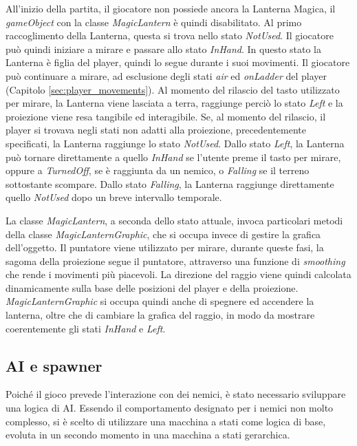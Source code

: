 All’inizio della partita, il giocatore non possiede ancora la Lanterna Magica, il \textit{gameObject} con la classe \textit{MagicLantern} è quindi disabilitato. Al primo raccoglimento della Lanterna, questa si trova nello stato \textit{NotUsed}. Il giocatore può quindi iniziare a mirare e passare allo stato \textit{InHand}. In questo stato la Lanterna è figlia del player, quindi lo segue durante i suoi movimenti.
Il giocatore può continuare a mirare, ad esclusione degli stati \textit{air} ed \textit{onLadder} del player (Capitolo \ref{sec:player_movements}).
Al momento del rilascio del tasto utilizzato per mirare, la Lanterna viene lasciata a terra, raggiunge perciò lo stato \textit{Left} e la proiezione viene resa tangibile ed interagibile. Se, al momento del rilascio, il player si trovava negli stati non adatti alla proiezione, precedentemente specificati, la Lanterna raggiunge lo stato \textit{NotUsed}.
Dallo stato \textit{Left}, la Lanterna può tornare direttamente a quello \textit{InHand} se l’utente preme il tasto per mirare, oppure a \textit{TurnedOff}, se è raggiunta da un nemico, o \textit{Falling} se il terreno sottostante scompare.
Dallo stato \textit{Falling}, la Lanterna raggiunge direttamente quello \textit{NotUsed} dopo un breve intervallo temporale.

La classe \textit{MagicLantern}, a seconda dello stato attuale, invoca particolari metodi della classe \textit{MagicLanternGraphic}, che si occupa invece di gestire la grafica dell’oggetto.
Il puntatore viene utilizzato per mirare, durante queste fasi, la sagoma della proiezione segue il puntatore, attraverso una funzione di \textit{smoothing} che rende i movimenti più piacevoli. La direzione del raggio viene quindi calcolata dinamicamente sulla base delle posizioni del player e della proiezione.
\textit{MagicLanternGraphic} si occupa quindi anche di spegnere ed accendere la lanterna, oltre che di cambiare la grafica del raggio, in modo da mostrare coerentemente gli stati \textit{InHand} e \textit{Left}.


\subsection{AI e spawner}

Poiché il gioco prevede l'interazione con dei nemici, è stato necessario sviluppare una logica di AI. Essendo il comportamento designato per i nemici non molto complesso, si è scelto di utilizzare una macchina a stati come logica di base, evoluta in un secondo momento in una macchina a stati gerarchica.


